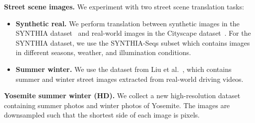 \documentclass[runningheads]{llncs}
\newcommand{\vpara}[1]{\vspace{0.05in}\noindent\textbf{#1}}
\begin{document}
\vpara{Street scene images.} We experiment with two street scene translation tasks: 
\begin{itemize}
		\item \textbf{Synthetic  real.} We perform translation between synthetic images in the SYNTHIA dataset~\cite{ros2016synthia} and real-world images in the Cityscape dataset~\cite{cordts2016cityscapes}. For the SYNTHIA dataset, we use the SYNTHIA-Seqs subset which contains images in different seasons, weather, and illumination conditions.
		\item \textbf{Summer  winter.} We use the dataset from Liu et al.~\cite{liu2017unsupervised}, which contains summer and winter street images extracted from real-world driving videos.
	\end{itemize}
\vpara{Yosemite summer  winter (HD).} We collect a new high-resolution dataset containing  summer photos and  winter photos of Yosemite. The images are downsampled such that the shortest side of each image is  pixels.
	
\end{document}
